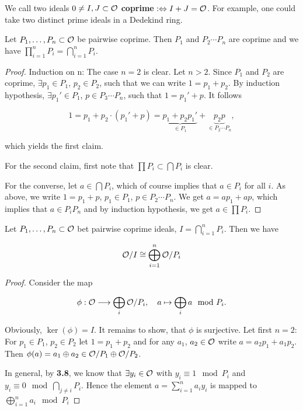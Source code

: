 
\begin{defi}
	We call two ideals $0 \neq I, J \subset \mathcal{O}$ \textbf{coprime} $:\Leftrightarrow I + J = \mathcal{O}$. For example, one could take two distinct prime ideals in a Dedekind ring.
\end{defi}

\begin{Bem}
	Let $P_1, \dots, P_n \subset \mathcal{O}$ be pairwise coprime.
	Then $P_1$ and $P_2 \cdots P_n$ are coprime and we have $\prod_{i=1}^n P_i = \bigcap_{i=1}^n P_i.$
\end{Bem}
\begin{proof}
	Induction on n: The case $n = 2$ is clear.	
	Let $n > 2$.
	Since $P_1$ and $P_2$ are coprime, $\exists p_1 \in P_1$, $p_2 \in P_2$, such that we can write $1 = p_1 + p_2$.
	By induction hypothesis, $\exists p_1' \in P_1$, $p \in P_3 \cdots P_n$, such that $1 = p_1' + p$.
	 It follows
		
	\[ 1 = p_1 + p_2 \cdot (p_1'+p)	= \underbrace{p_1+p_2p_1'}_{\in P_1} + \underbrace{p_2p}_{\in P_2 \cdots P_n}, \]
		
	which yields the first claim.
	
	\bigskip
	
	For the second claim, first note that $\prod P_i \subset \bigcap P_i$ is clear.
	
	For the converse, let $a \in \bigcap P_i$, which of course implies that $a \in P_i$ for all $i$.
	As above, we write $1 = p_1 + p$,  $p_1 \in P_1$, $p \in P_2 \cdots P_n$.
	We get  $a = ap_1 + ap$, which implies that $a \in P_iP_n$ and by induction hypothesis, we get $a \in \prod P_i$.
\end{proof}
	
\begin{Satz}
	Let $P_1, \dots, P_n \subset \mathcal{O}$ bet pairwise coprime ideals, $I = \bigcap_{i=1}^n P_i$.
	Then we have
	
	\[ \mathcal{O} / I \cong \bigoplus_{i=1}^n \mathcal{O} / P_i	\] 
\end{Satz}
\begin{proof}
	Consider the map 
		
	\[ \phi: \mathcal{O} \longrightarrow \bigoplus_i \mathcal{O} /P_i, \quad  a \mapsto \bigoplus_i a \mod P_i. \] 
		
	Obviously, $\ker(\phi) = I$.
	It remains to show, that $\phi$ is surjective.
	Let first $n = 2$:	
	For $p_1 \in P_1$, $p_2 \in P_2$ let $1 = p_1 + p_2$ and for any $a_1$, $a_2 \in \mathcal{O}$ write $a = a_2p_1 + a_1p_2$. Then $\phi(a) = a_1 \oplus a_2 \in \mathcal{O} / P_1 \oplus \mathcal{O} / P_2$.
	
	\bigskip
	
	In general, by \textbf{3.8}, we know that $\exists y_i \in \mathcal{O}$ with $y_i \equiv 1 \mod P_i$ and $y_i \equiv 0 \mod \bigcap_{j \neq i}P_i$. Hence the element $a = \sum_{i = 1}^n a_iy_i$ is mapped to $\bigoplus_{i=1}^n a_i \mod P_i$	
\end{proof}


